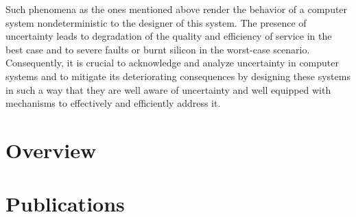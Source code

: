 Such phenomena as the ones mentioned above render the behavior of a computer
system nondeterministic to the designer of this system. The presence of
uncertainty leads to degradation of the quality and efficiency of service in the
best case and to severe faults or burnt silicon in the worst-case scenario.
Consequently, it is crucial to acknowledge and analyze uncertainty in computer
systems and to mitigate its deteriorating consequences by designing these
systems in such a way that they are well aware of uncertainty and well equipped
with mechanisms to effectively and efficiently address it.

\section{Overview}

\section{Publications}
